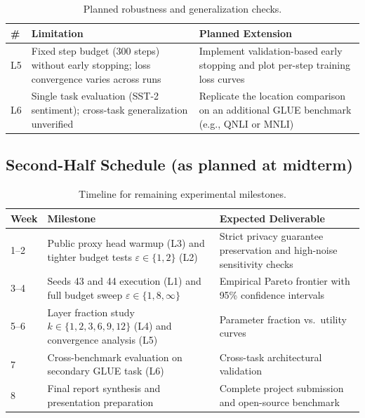 \documentclass[11pt,a4paper]{article}
\begin{document}
\begin{table}[htbp]
\centering
\caption{Planned robustness and generalization checks.}
\label{tab:limitations_sec}
\setlength{\tabcolsep}{5pt}
\begin{tabularx}{\textwidth}{@{}C{0.55cm} >{\RaggedRight\arraybackslash}X >{\RaggedRight\arraybackslash}X @{}}
\toprule
\textbf{\#} & \textbf{Limitation} & \textbf{Planned Extension} \\
\midrule
L5 & Fixed step budget (300 steps) without early stopping; loss convergence varies across runs &
     Implement validation-based early stopping and plot per-step training loss curves \\
L6 & Single task evaluation (SST-2 sentiment); cross-task generalization unverified &
     Replicate the location comparison on an additional GLUE benchmark (e.g., QNLI or MNLI) \\
\bottomrule
\end{tabularx}
\end{table}

\subsection{Second-Half Schedule (as planned at midterm)}

\begin{table}[htbp]
\centering
\caption{Timeline for remaining experimental milestones.}
\label{tab:schedule}
\setlength{\tabcolsep}{8pt}
\begin{tabularx}{\textwidth}{@{}C{1.05cm} >{\RaggedRight\arraybackslash}X >{\RaggedRight\arraybackslash}X @{}}
\toprule
\textbf{Week} & \textbf{Milestone} & \textbf{Expected Deliverable} \\
--2 & Public proxy head warmup (L3) and tighter budget tests $\varepsilon \in \{1, 2\}$ (L2) &
       Strict privacy guarantee preservation and high-noise sensitivity checks \\
3--4 & Seeds 43 and 44 execution (L1) and full budget sweep $\varepsilon \in \{1, 8, \infty\}$ &
       Empirical Pareto frontier with 95\% confidence intervals \\
5--6 & Layer fraction study $k \in \{1, 2, 3, 6, 9, 12\}$ (L4) and convergence analysis (L5) &
       Parameter fraction vs.\ utility curves \\
7   & Cross-benchmark evaluation on secondary GLUE task (L6) &
       Cross-task architectural validation \\
8   & Final report synthesis and presentation preparation &
       Complete project submission and open-source benchmark \\
\bottomrule
\end{tabularx}
\end{table}
\end{document}
